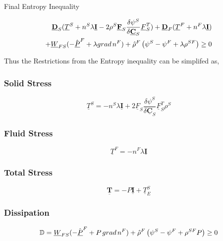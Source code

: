 \documentclass[12pt]{article}
\begin{document}
Final Entropy Inequality

\begin{equation}
	\begin{aligned}
		{\underline{\mathbf{D}}_{S}}{({\underline{T}^{S}}+{{n^S}{\lambda}{\underline{\mathbf{I}}}}-{2}{\rho^S}{\underline{\mathbf{F}}}_{S}{\frac{\delta {\psi^S}}{\delta {\underline{\mathbf{C}}}_{S}}}{\underline{F}}_{S}^{T})}
		+ {\underline{\mathbf{D}}_{F}}{({\underline{T}^{F}}+{{n^F}{\lambda}{\underline{\mathbf{I}}}})} 
		\\ + {\underline{W}_{FS}}{({-\hat{\underline{P}}}^{F}+{\lambda}{grad}\hspace{0.5mm}{n^F})} +{{\hat{\rho}^F}}\left({{{\psi^S}-{\psi^F}+{{\lambda}{\rho^{SF}}}}}\right) \geq 0
	\end{aligned}
\end{equation}
\newpage

Thus the Restrictions from the Entropy inequality can be simplifed as,

\subsubsection{Solid Stress}
\begin{equation}
	\underline{T}^S = {-{n^S}{\lambda}{\underline{\mathbf{I}}}} + {2}{\underline{F}_S}{\frac{\delta \psi^S}{\delta \underline{\mathbf{C}}_S}}{\underline{F}_{S}^{T}}{\rho^S}
\end{equation}

\subsubsection{Fluid Stress}
\begin{equation}
	\underline{T}^F = {-{n^F}{\lambda}{\underline{\mathbf{I}}}}
\end{equation}

\subsubsection{Total Stress}
\begin{equation}
	\underline{\mathbf{T}} = {-{P}\underline{\mathbf{I}}} + {\underline{T}_{E}^{S}} 
\end{equation}

\subsubsection{Dissipation}
\begin{equation}
	\mathbb{D} = {\underline{W}}_{FS}{(-{\hat{\underline{P}}^F}+{P\hspace{0.5mm}grad\hspace{0.5mm}{n^F}})} + {{{\hat{\rho}^F}}\left({{{\psi^S}-{\psi^F}+{\rho^{SF}{P}}}}\right) }    \geq 0
\end{equation}
\end{document}

